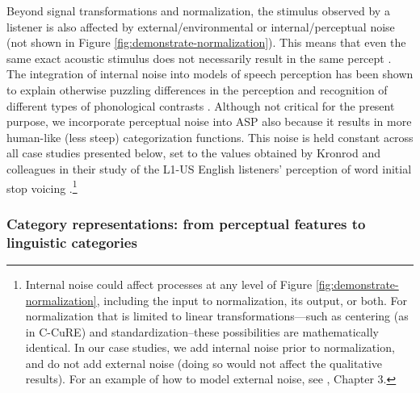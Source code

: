 \documentclass[
  11pt,
  man,floatsintext]{apa6}
\begin{document}
Beyond signal transformations and normalization, the stimulus observed by a listener is also affected by external/environmental or internal/perceptual noise (not shown in Figure \ref{fig:demonstrate-normalization}). This means that even the same exact acoustic stimulus does not necessarily result in the same percept \autocites{leonard2016}[p.~148]{nearey-hogan1986}{schuerman2022}. The integration of internal noise into models of speech perception has been shown to explain otherwise puzzling differences in the perception and recognition of different types of phonological contrasts \autocites[e.g.,][]{feldman2009,kronrod2016}. Although not critical for the present purpose, we incorporate perceptual noise into ASP also because it results in more human-like (less steep) categorization functions. This noise is held constant across all case studies presented below, set to the values obtained by Kronrod and colleagues in their study of the L1-US English listeners' perception of word initial stop voicing \autocite*[\(\sigma^2_{noise, VOT}=80 msec^2\), \(\sigma^2_{noise, spectral}=878 Mel^2\)]{kronrod2016}.\footnote{Internal noise could affect processes at any level of Figure \ref{fig:demonstrate-normalization}, including the input to normalization, its output, or both. For normalization that is limited to linear transformations---such as centering (as in C-CuRE) and standardization--these possibilities are mathematically identical. In our case studies, we add internal noise prior to normalization, and do not add external noise (doing so would not affect the qualitative results). For an example of how to model external noise, see \textcite{burchill2023}, Chapter 3.}

\hypertarget{sec:representations}{%
\subsubsection{Category representations: from perceptual features to linguistic categories}\label{sec:representations}}
\end{document}
